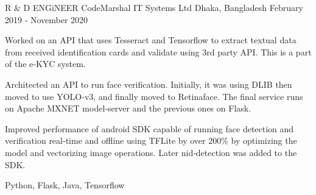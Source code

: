 \cventry
    {R \& D ENGiNEER }
    {CodeMarshal IT Systems Ltd}
    {Dhaka, Bangladesh}
    {February 2019 ‑ November 2020}
    {
      \begin{cvitems}
        \item {Worked on an API that uses Tesseract and Tensorflow to extract textual data from received identification cards and validate using 3rd party API. This is a part of the e‑KYC system.}
        \item {Architected an API to run face verification. Initially, it was using DLIB then moved to use YOLO‑v3, and finally moved to Retinaface. The final service runs on Apache MXNET model‑server and the previous ones on Flask.}
        \item {Improved performance of android SDK capable of running face detection and verification real‑time and offline using TFLite by over 200\% by optimizing the model and vectorizing image operations. Later nid‑detection was added to the SDK.}
      \end{cvitems}
    }
    {Python, Flask, Java, Tensorflow}
